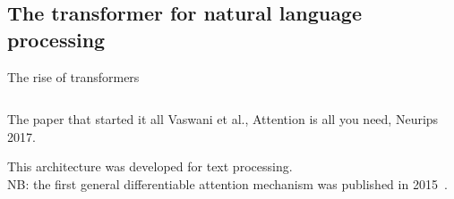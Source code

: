 \documentclass[xcolor=pdftex,dvipsnames,table,mathserif]{beamer}
\begin{document}
\subsection{The transformer for natural language processing}




\begin{frame}{The rise of transformers}

  \begin{columns}

    \begin{column}{.5\textwidth}
      \begin{block}{The paper that started it all}
        Vaswani et al., Attention is all you need, Neurips 2017.
      \end{block}
      This architecture was developed for text processing.\\
\vspace{2em}
        NB: the first general differentiable attention mechanism was published in 2015~\cite{bahdanau_neural_2015}.

    \end{column}


\end{columns}
\end{frame}
\end{document}
